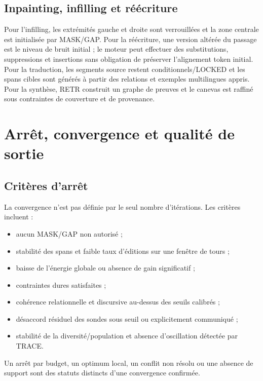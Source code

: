 \documentclass[11pt,a4paper,oneside]{report}
\begin{document}
\section{Inpainting, infilling et réécriture}
Pour l'infilling, les extrémités gauche et droite sont verrouillées et la zone centrale est initialisée par MASK/GAP. Pour la réécriture, une version altérée du passage est le niveau de bruit initial ; le moteur peut effectuer des substitutions, suppressions et insertions sans obligation de préserver l'alignement token initial. Pour la traduction, les segments source restent conditionnels/LOCKED et les spans cibles sont générés à partir des relations et exemples multilingues appris. Pour la synthèse, RETR construit un graphe de preuves et le canevas est raffiné sous contraintes de couverture et de provenance.

\chapter{Arrêt, convergence et qualité de sortie}
\section{Critères d'arrêt}
La convergence n'est pas définie par le seul nombre d'itérations. Les critères incluent :
\begin{itemize}
\item aucun MASK/GAP non autorisé ;
\item stabilité des spans et faible taux d'éditions sur une fenêtre de tours ;
\item baisse de l'énergie globale ou absence de gain significatif ;
\item contraintes dures satisfaites ;
\item cohérence relationnelle et discursive au-dessus des seuils calibrés ;
\item désaccord résiduel des sondes sous seuil ou explicitement communiqué ;
\item stabilité de la diversité/population et absence d'oscillation détectée par TRACE.
\end{itemize}
Un arrêt par budget, un optimum local, un conflit non résolu ou une absence de support sont des statuts distincts d'une convergence confirmée.
\end{document}
